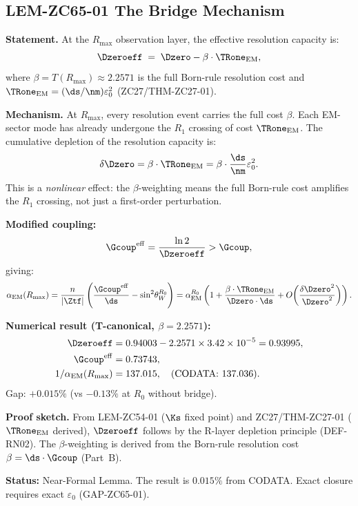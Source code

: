 \documentclass[12pt, a4paper]{article}
\renewcommand{\swsq}{\sin^2\!\theta_W}
\renewcommand{\aEM}{\alpha_{\rm EM}}
\begin{document}
\subsection{LEM-ZC65-01 \quad The Bridge Mechanism}
\label{sec:lem01}


\begin{formalbox}[title={LEM-ZC65-01: Effective Resolution Capacity
  at $R_{\max}$ ($R_0$, Near-Formal)}]
\textbf{Statement.}
At the $R_{\max}$ observation layer, the effective resolution
capacity is:
\begin{equation}
  \Dzeroeff \;=\; \Dzero - \beta\cdot\TRone_{\rm EM},
  \label{eq:D0eff}
\end{equation}
where $\beta = T(R_{\max}) \approx 2.2571$ is the full Born-rule
resolution cost and
$\TRone_{\rm EM} = (\ds/\nm)\varepsilon_0^2$ (ZC27/THM-ZC27-01).

\textbf{Mechanism.}
At $R_{\max}$, every resolution event carries the full cost
$\beta$. Each EM-sector mode has already undergone the
$R_1$ crossing of cost $\TRone_{\rm EM}$.
The cumulative depletion of the resolution capacity is:
\[
  \delta\Dzero = \beta\cdot\TRone_{\rm EM}
  = \beta\cdot\frac{\ds}{\nm}\varepsilon_0^2.
\]
This is a \emph{nonlinear} effect: the $\beta$-weighting
means the full Born-rule cost amplifies the $R_1$ crossing,
not just a first-order perturbation.

\textbf{Modified coupling:}
\[
  \Gcoup^{\rm eff} = \frac{\ln 2}{\Dzeroeff} > \Gcoup,
\]
giving:
\[
  \aEM(R_{\max})
  = \frac{n}{|\Ztf|}\left(\frac{\Gcoup^{\rm eff}}{\ds}
    - \swsq^{R_0}\right)
  = \aEM^{R_0}\left(1 + \frac{\beta\cdot\TRone_{\rm EM}}{\Dzero\cdot\ds}
    + O\!\left(\frac{\delta\Dzero^2}{\Dzero^2}\right)\right).
\]

\textbf{Numerical result (T-canonical, $\beta = 2.2571$):}
\begin{align*}
  \Dzeroeff &= 0.94003 - 2.2571\times3.42\times10^{-5}
  = 0.93995, \\
  \Gcoup^{\rm eff} &= 0.73743, \\
  1/\aEM(R_{\max}) &= 137.015, \quad\text{(CODATA: }137.036).
\end{align*}
Gap: $+0.015\%$ (vs $-0.13\%$ at $R_0$ without bridge).

\textbf{Proof sketch.}
From LEM-ZC54-01 ($\Ks$ fixed point) and ZC27/THM-ZC27-01
($\TRone_{\rm EM}$ derived), $\Dzeroeff$ follows by the
R-layer depletion principle (DEF-RN02).
The $\beta$-weighting is derived from the Born-rule
resolution cost $\beta = \ds\cdot\Gcoup$ (Part~B).

\textbf{Status:} Near-Formal Lemma.
The result is $0.015\%$ from CODATA.
Exact closure requires exact $\varepsilon_0$ (GAP-ZC65-01).
\end{formalbox}
\end{document}
